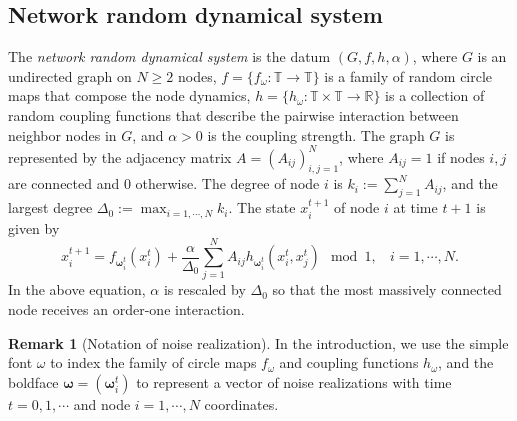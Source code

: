\documentclass[a4paper]{article}
\theoremstyle{plain}
\theoremstyle{definition}
\newtheorem{rem}[theorem]{Remark}
\newcommand{\R}{\mathbb{R}}
\newcommand{\T}{\mathbb{T}}
\begin{document}
 
 
\subsection{Network random dynamical system} \label{sec:network_RDS_setup}
	The \textit{network random dynamical system} is the datum $(G,f,h,\alpha)$, where $G$ is an undirected graph on $N\geq 2$ nodes, $f=\{f_{\omega}:\T\to\T\}$ is a family of random circle maps that compose the node dynamics, $h=\{h_{\omega}:\T\times\T\to\R\}$ is a collection of random coupling functions that describe the pairwise interaction between neighbor nodes in $G$, and $\alpha >0$ is the coupling strength. The graph $G$ is represented by the adjacency matrix $A=(A_{ij})_{i,j=1}^N$, where $A_{ij}=1$ if nodes $i,j$ are connected and 0 otherwise. The degree of node $i$ is $k_i:=  \sum_{j=1}^N A_{ij}$, and the largest degree $\Delta_0:= \max_{i=1,\cdots,N}  k_i$. 
		The state $x_i^{t+1}$ of node $i$ at time $t+1$
		is given by
		\begin{equation}\label{eq:network_dynamics}
			x_i^{t+1} = f_{\boldsymbol{\omega}_i^t}(x_i^t) + \frac{\alpha}{\Delta_0} \sum_{j=1}^{N} A_{ij} h_{\boldsymbol{\omega}_i^t} (x_i^t,x_j^t)\mod 1,~~~~i=1,\cdots,N.
		\end{equation}
In the above equation, $\alpha$ is rescaled by $\Delta_0$ so that the most massively connected node receives an order-one interaction. %

\begin{rem}[Notation of noise realization]
In the introduction, we use the simple font $\omega$ to index the family of circle maps $f_{\omega}$ and coupling functions $h_{\omega}$, and the boldface $\boldsymbol{\omega}=(\boldsymbol{\omega}_i^t)$ to represent a vector of noise realizations with time $t=0,1,\cdots$ and node $i=1,\cdots,N$ coordinates.
\end{rem}
\end{document}
